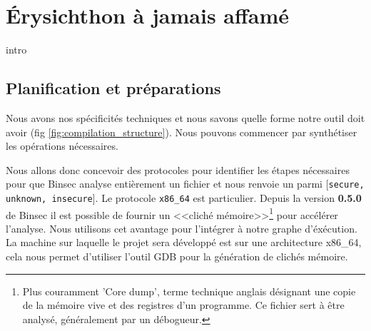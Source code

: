 \chapter{Érysichthon à jamais affamé}
\label{chap:erysichtonUsage}

intro


\section{Planification et préparations}

Nous avons nos spécificités techniques et nous savons quelle forme notre outil doit avoir (fig \ref{fig:compilation_structure}). Nous pouvons commencer par synthétiser les opérations nécessaires.\smallbreak

Nous allons donc concevoir des protocoles pour identifier les étapes nécessaires pour que Binsec analyse entièrement un fichier et nous renvoie un parmi [\texttt{secure, unknown, insecure}]. Le protocole \texttt{x86\_64} est particulier. Depuis la version \textbf{0.5.0} de Binsec il est possible de fournir un <<cliché mémoire>>\footnote{Plus couramment 'Core dump', terme technique anglais désignant une copie de la mémoire vive et des registres d'un programme. Ce fichier sert à être analysé, généralement par un débogueur.} pour accélérer l'analyse. Nous utilisons cet avantage pour l'intégrer à notre graphe d'éxécution. La machine sur laquelle le projet sera développé est sur une architecture x86\_64, cela nous permet d'utiliser l'outil GDB pour la génération de clichés mémoire.\medbreak

